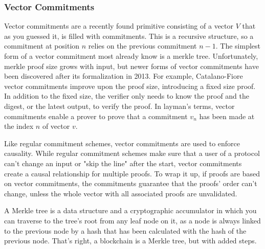 \subsubsection{Vector Commitments}
Vector commitments are a recently found primitive consisting of a vector \(V\) that as you guessed it, is filled with commitments. This is a recursive structure, so a commitment at position \(n\) relies on the previous commitment \(n-1\). The simplest form of a vector commitment most already know is a merkle tree. Unfortunately, merkle proof size grows with input, but newer forms of vector commitments have been discovered after its formalization in 2013. For example, Catalano-Fiore vector commitments improve upon the proof size, introducing a fixed size proof. In addition to the fixed size, the verifier only needs to know the proof and the digest, or the latest output, to verify the proof. In layman's terms, vector commitments enable a prover to prove that a commitment \(v_n\) has been made at the index \(n\) of vector \(v\).


Like regular commitment schemes, vector commitments are used to enforce causality. While regular commitment schemes make sure that a user of a protocol can't change an input or "skip the line" after the start, vector commitments create a causal relationship for multiple proofs. To wrap it up, if proofs are based on vector commitments, the commitments guarantee that the proofs' order can't change, unless the whole vector with all associated proofs are unvalidated.

A Merkle tree is a data structure and a cryptographic accumulator in which you can traverse to the tree's root from any leaf node on it, as a node is always linked to the previous node by a hash that has been calculated with the hash of the previous node. That's right, a blockchain is a Merkle tree, but with added steps.

